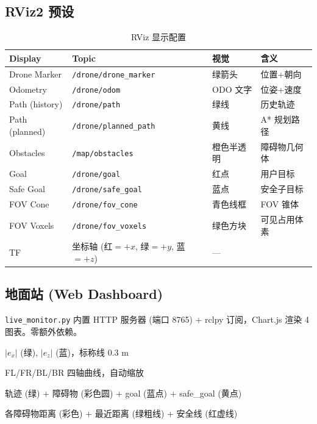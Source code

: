 \documentclass[12pt,a4paper]{article}
\begin{document}
\subsection{RViz2 预设}

\begin{table}[H]
\centering
\caption{RViz 显示配置}
\label{tab:rviz}
\footnotesize
\begin{tabularx}{\textwidth}{l l l X}
\toprule
\textbf{Display} & \textbf{Topic} & \textbf{视觉} & \textbf{含义} \\
\midrule
Drone Marker & \texttt{/drone/drone\_marker} & 绿箭头 & 位置+朝向 \\
Odometry &     \texttt{/drone/odom} & ODO 文字 & 位姿+速度 \\
Path (history) &  \texttt{/drone/path} & 绿线 & 历史轨迹 \\
Path (planned) &  \texttt{/drone/planned\_path} & 黄线 & A* 规划路径 \\
Obstacles &      \texttt{/map/obstacles} & 橙色半透明 & 障碍物几何体 \\
Goal &            \texttt{/drone/goal} & 红点 & 用户目标 \\
Safe Goal &       \texttt{/drone/safe\_goal} & 蓝点 & 安全子目标 \\
FOV Cone &        \texttt{/drone/fov\_cone} & 青色线框 & FOV 锥体 \\
FOV Voxels &      \texttt{/drone/fov\_voxels} & 绿色方块 & 可见占用体素 \\
TF & 坐标轴 (红$=+x$, 绿$=+y$, 蓝$=+z$) & --- \\
\bottomrule
\end{tabularx}
\end{table}

\subsection{地面站 (Web Dashboard)}

\texttt{live\_monitor.py} 内置 HTTP 服务器 (端口 8765) + rclpy 订阅，Chart.js 渲染 4 图表。零额外依赖。

\begin{description}[nosep, leftmargin=*]
  \item[1. Position Error] $|e_x|$ (绿), $|e_z|$ (蓝)，标称线 0.3 m
  \item[2. Motor RPM] FL/FR/BL/BR 四轴曲线，自动缩放
  \item[3. XY Trajectory] 轨迹 (绿) + 障碍物 (彩色圆) + goal (蓝点) + safe\_goal (黄点)
  \item[4. Obstacle Distances] 各障碍物距离 (彩色) + 最近距离 (绿粗线) + 安全线 (红虚线)
\end{description}
\end{document}
